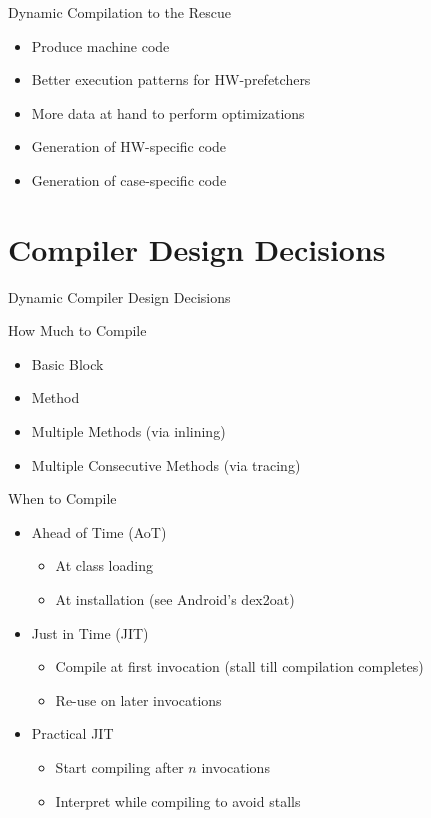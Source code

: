 \documentclass[
14pt,
aspectratio=169,
usenames,
dvipsnames,
x11names]{beamer}
\begin{document}
\begin{frame}{Dynamic Compilation to the Rescue}
  \begin{itemize}  \setlength{\itemsep}{\fill}
  \item Produce machine code
  \item Better execution patterns for HW-prefetchers
  \item More data at hand to perform optimizations
  \item Generation of HW-specific code
  \item Generation of case-specific code
  \end{itemize}
\end{frame}


\section{Compiler Design Decisions}

\begin{frame}
  \centering
  {Dynamic Compiler Design Decisions}
\end{frame}

\begin{frame}{How Much to Compile}
  \begin{itemize}  \setlength{\itemsep}{\fill}
  \item Basic Block
  \item Method
  \item Multiple Methods (via inlining)
  \item Multiple Consecutive Methods (via tracing)
  \end{itemize}
\end{frame}

\begin{frame}{When to Compile}
  \begin{itemize}  \setlength{\itemsep}{\fill}
  \item Ahead of Time (AoT)
    \begin{itemize}
    \item At class loading
    \item At installation (see Android's dex2oat)
    \end{itemize}
  \item Just in Time (JIT)
    \begin{itemize}
    \item Compile at first invocation (stall till compilation completes)
    \item Re-use on later invocations
    \end{itemize}
  \item Practical JIT
    \begin{itemize}
    \item Start compiling after $n$ invocations
    \item Interpret while compiling to avoid stalls
    \end{itemize}
  \end{itemize}
\end{frame}
\end{document}
